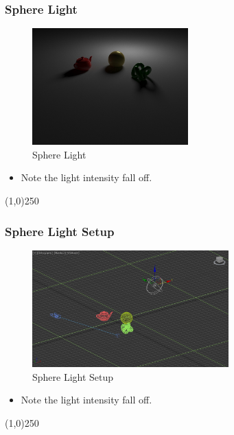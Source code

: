 \begin{frame}
	\frametitle{Sphere Light}
	\begin{figure}
		\centering
		\includegraphics[height=4.5cm]{./Lights/Sphere}
		\caption{Sphere Light}
		\label{fig:SphereLight}
	\end{figure}
	\begin{itemize}
		\item Note the light intensity fall off.
	\end{itemize}
\end{frame}
\begin{center}\line(1,0){250}\end{center}



\begin{frame}
	\frametitle{Sphere Light Setup}
	\begin{figure}
		\centering
		\includegraphics[height=4.5cm]{./Lights/SphereSetup}
		\caption{Sphere Light Setup}
		\label{fig:SphereLightSetup}
	\end{figure}
	\begin{itemize}
		\item Note the light intensity fall off.
	\end{itemize}
\end{frame}
\begin{center}\line(1,0){250}\end{center}




